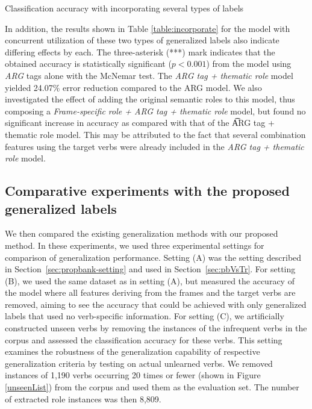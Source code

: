 \documentclass[english]{jnlp_1.4_rep}
\begin{document}
\begin{table}[t]
\caption{Classification accuracy with incorporating several types of labels}
\label{table:incorporate}

\end{table}

In addition, the results shown in Table \ref{table:incorporate} for the model with concurrent utilization of these two types of generalized labels also indicate differing effects by each. The three-asterisk (***) mark indicates that the obtained accuracy is statistically significant ($p < 0.001$) from the model using {\it ARG} tags alone with the McNemar test. The {\it ARG tag + thematic role} model yielded 24.07\% error reduction compared to the ARG model. We also investigated the effect of adding the original semantic roles to this model, thus composing a {\it Frame-specific role + ARG tag + thematic role} model, but found no significant increase in accuracy as compared with that of the {\t ARG tag + thematic role} model. This may be attributed to the fact that several combination features using the target verbs were already included in the {\it ARG tag + thematic role} model.


\subsection{Comparative experiments with the proposed generalized labels}

We then compared the existing generalization methods with our proposed method. In these experiments, we used three experimental settings for comparison of generalization performance. Setting (A) was the setting described in Section~\ref{sec:propbank-setting} and used in Section~\ref{sec:pbVsTr}. For setting (B),
we used the same dataset as in setting (A), but measured the accuracy of the model where all features deriving from the frames and the target verbs are removed, aiming to see the accuracy that could be achieved with only generalized labels that used no verb-specific information.
For setting (C), we artificially constructed unseen verbs by removing the instances of the infrequent verbs in the corpus and assessed the classification accuracy for these verbs. This setting examines the robustness of the generalization capability of respective generalization criteria by testing on actual unlearned verbs. We removed instances of 1,190 verbs occurring 20 times or fewer (shown in Figure \ref{unseenList}) from the corpus and used them as the evaluation set. The number of extracted role instances was then 8,809.
\end{document}
